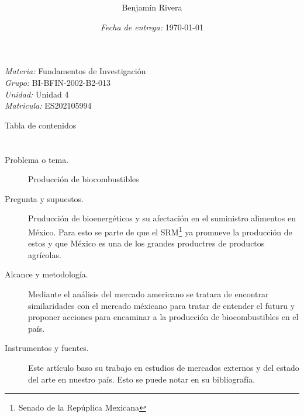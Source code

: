 \documentclass[12pt]{beamer}
\title[Actividad 1]{
	\bf{\titulo}}
\author{ Benjamín Rivera }
\institute{Universidad Abierta y a Distancia de México \\
	\tiny
	TSU en Biotecnolog\'ia }
\date{\textit{Fecha de entrega:} \today}
\newcommand{\materia}[0]{Fundamentos de Investigación}
\newcommand{\grupo}[0]{BI-BFIN-2002-B2-013}
\newcommand{\unidad}[0]{Unidad 4}
\begin{document}
	\begin{frame}
		\maketitle\tiny
		\textit{Materia:} \materia \\
		\textit{Grupo:} \grupo \\
		\textit{Unidad:} \unidad \\
		\textit{Matricula:} ES202105994
		
	\end{frame}

	\begin{frame}{Tabla de contenidos}
		\tableofcontents
	\end{frame}

\section{\cite{inv 1}}
	\begin{frame}{\cite{inv 1}}
		\begin{description}
			\item[Problema o tema.] Producción de biocombustibles
			\item[Pregunta y supuestos.] Pruducción de bioenergéticos y su afectación en el suministro alimentos en México. Para esto se parte de que el SRM\footnote{Senado de la Repúplica Mexicana} ya promueve la producción de estos y que México es una de los grandes productres de productos agrícolas.
		\end{description}
	\end{frame}
	\begin{frame}{\cite{inv 1}}
		\begin{description}
			\item[Alcance y metodología.] Mediante el análisis del mercado americano se tratara de encontrar similaridades con el mercado méxicano para tratar de entender el futuru y proponer acciones para encaminar a la producción de biocombustibles en el país.
			\item[Instrumentos y fuentes.] Este artículo baso su trabajo en estudios de mercados externos y del estado del arte en nuestro país. Esto se puede notar en su bibliografía.
		\end{description}
	\end{frame}
\end{document}
